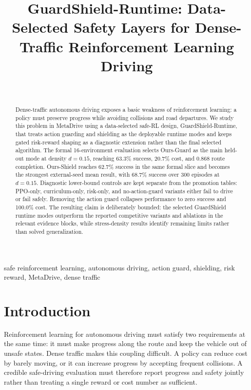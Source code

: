 \documentclass[conference,a4paper]{IEEEtran}
\newcommand{\method}{GuardShield-Runtime}
\begin{document}
\title{GuardShield-Runtime: Data-Selected Safety Layers for Dense-Traffic Reinforcement Learning Driving}
\author{\\
}
\maketitle
\begin{abstract}
Dense-traffic autonomous driving exposes a basic weakness of reinforcement learning: a policy must preserve progress while avoiding collisions and road departures. We study this problem in MetaDrive using a data-selected safe-RL design, \method{}, that treats action guarding and shielding as the deployable runtime modes and keeps gated risk-reward shaping as a diagnostic extension rather than the final selected algorithm. The formal 16-environment evaluation selects Ours-Guard as the main held-out mode at density $d=0.15$, reaching 63.3\% success, 20.7\% cost, and 0.868 route completion. Ours-Shield reaches 62.7\% success in the same formal slice and becomes the strongest external-seed mean result, with 68.7\% success over 300 episodes at $d=0.15$. Diagnostic lower-bound controls are kept separate from the promotion tables: PPO-only, curriculum-only, risk-only, and no-action-guard variants either fail to drive or fail safely. Removing the action guard collapses performance to zero success and 100.0\% cost. The resulting claim is deliberately bounded: the selected GuardShield runtime modes outperform the reported competitive variants and ablations in the relevant evidence blocks, while stress-density results identify remaining limits rather than solved generalization.
\end{abstract}
\begin{IEEEkeywords}
safe reinforcement learning, autonomous driving, action guard, shielding, risk reward, MetaDrive, dense traffic
\end{IEEEkeywords}
\section{Introduction}
Reinforcement learning for autonomous driving must satisfy two requirements at the same time: it must make progress along the route and keep the vehicle out of unsafe states. Dense traffic makes this coupling difficult. A policy can reduce cost by barely moving, or it can increase progress by accepting frequent collisions. A credible safe-driving evaluation must therefore report progress and safety jointly rather than treating a single reward or cost number as sufficient.
\end{document}

